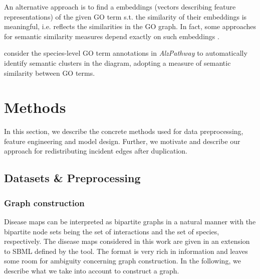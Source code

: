 \documentclass[
	fontsize=10pt, %
	twoside=false, %
	secnumdepth=1, %
  toc=indentunnumbered %
]{kaobook}
\begin{document}
An alternative approach is to find a embeddings (vectors describing feature
representations) of the given GO term s.t. the similarity of their embeddings is
meaningful, i.e. reflects the similarities in the GO graph. In fact, some
approaches for semantic similarity measures depend exactly on such embeddings
\cite{zhong_GO2VecTransformingGO_2020}.

\citeauthor{ostaszewski_ClusteringApproachesVisual_2018} consider the
species-level GO term annotations in \textit{AlzPathway} to automatically
identify semantic clusters in the diagram, adopting a measure of semantic
similarity between GO terms.











\chapter{Methods}
\label{sec:methods}

In this section, we describe the concrete methods used for data
preprocessing, feature engineering and model design. Further, we motivate and
describe our approach for redistributing incident edges after duplication.

\section{Datasets \& Preprocessing}
\label{sec:datasets}


\subsection{Graph construction}
\label{sec:graph-interpretation}
Disease maps can be interpreted as bipartite graphs in a natural manner with the
bipartite node sets being the set of interactions and the set of species,
respectively. The disease maps considered in this work are given in an extension
to SBML defined by the  tool. The format is very rich in
information and leaves some room for ambiguity concerning graph construction. In
the following, we describe what we take into account to construct a graph.
\end{document}
